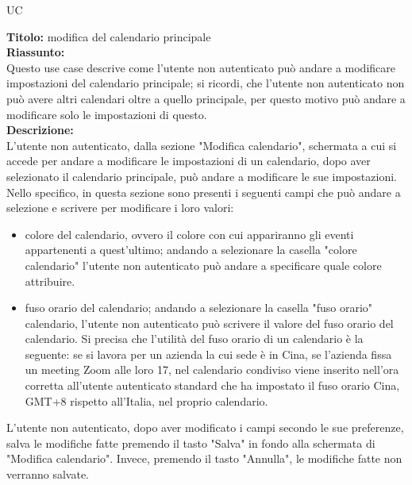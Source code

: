 \begin{listaPersonale}{UC}
    \begin{listaPersonale2}[UC] {}
            \textbf{Titolo: } modifica del calendario principale \\
            \textbf{Riassunto:} \\
            Questo use case descrive come l'utente non autenticato può andare a modificare impostazioni del calendario principale; si ricordi, che l'utente non autenticato non può avere altri calendari oltre a quello principale, per questo motivo può andare a modificare solo le impostazioni di questo. \\
            \textbf{Descrizione:} \\
            L'utente non autenticato, dalla sezione  "Modifica calendario", schermata a cui si accede per andare a modificare le impostazioni di un calendario, dopo aver selezionato il calendario principale, può andare a modificare le sue impostazioni. Nello specifico, in questa sezione sono presenti i seguenti campi che può andare a selezione e scrivere per modificare i loro valori:
            \begin{itemize}
                \item colore del calendario, ovvero il colore con cui appariranno gli eventi appartenenti a quest'ultimo; andando a selezionare la casella "colore calendario" l'utente non autenticato può andare a specificare quale colore attribuire.
                \item fuso orario del calendario; andando a selezionare la casella "fuso orario" calendario, l'utente non autenticato può scrivere il valore del fuso orario del calendario. Si precisa che l'utilità del fuso orario di un calendario è la seguente:  se si lavora per un azienda la cui sede è in Cina, se l'azienda fissa un meeting Zoom alle loro 17, nel calendario condiviso viene inserito nell'ora corretta all'utente autenticato standard che ha impostato il fuso orario Cina, GMT+8 rispetto all'Italia, nel proprio calendario.
            \end{itemize}
            L'utente non autenticato, dopo aver modificato i campi secondo le sue preferenze, salva le modifiche fatte premendo il tasto "Salva" in fondo alla schermata di "Modifica calendario". Invece, premendo il tasto "Annulla", le modifiche fatte non verranno salvate.


\end{listaPersonale2}
\end{listaPersonale}
